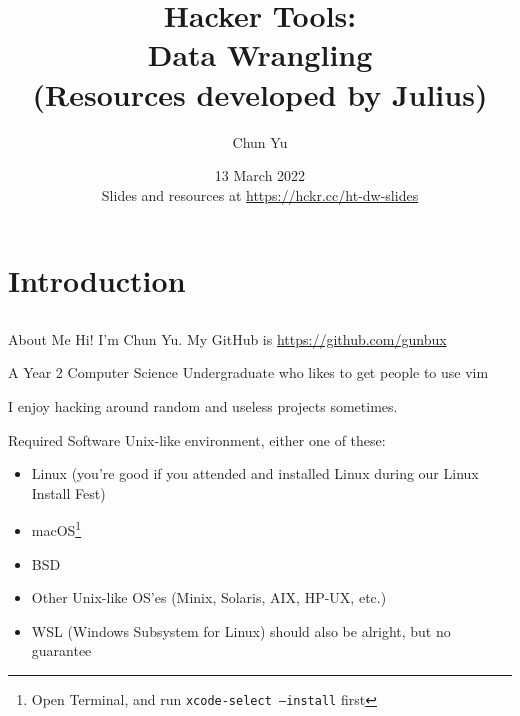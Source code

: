 \documentclass[12pt]{beamer}
\title{Hacker Tools: \\Data Wrangling \\ (Resources developed by Julius)}
\author{Chun Yu}
\date{13 March 2022 \\ Slides and resources at \url{https://hckr.cc/ht-dw-slides}}
\begin{document}
\frame[plain]{\titlepage}

\section{Introduction}
\subsection{}









\begin{frame}{About Me}
  Hi! I'm Chun Yu. My GitHub is \url{https://github.com/gunbux}

  A Year 2 Computer Science Undergraduate who likes to get people to use vim

  I enjoy hacking around random and useless projects sometimes.

\end{frame}

\begin{frame}{Required Software}
  Unix-like environment, either one of these:
  \begin{itemize}
    \item Linux (you're good if you attended and installed Linux during our Linux Install Fest)
    \item macOS\footnote{Open Terminal, and run \texttt{xcode-select --install} first}
    \item BSD
    \item Other Unix-like OS'es (Minix, Solaris, AIX, HP-UX, etc.)
    \item WSL (Windows Subsystem for Linux) should also be alright, but no guarantee
  \end{itemize}
\end{frame}
\end{document}
